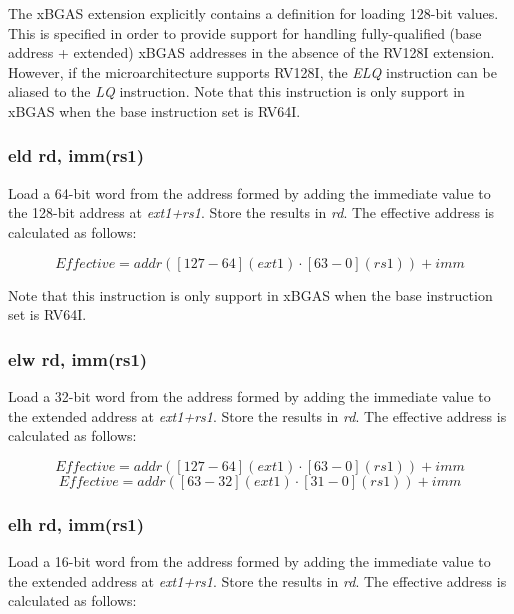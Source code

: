 \documentclass{article}
\begin{document}
\begin{commentary}
The xBGAS extension explicitly contains a definition for loading 128-bit values.  
This is specified in order to provide support for handling fully-qualified (base 
address + extended) xBGAS addresses in the absence of the RV128I extension.  However, 
if the microarchitecture supports RV128I, the \textit{ELQ} instruction can be aliased 
to the \textit{LQ} instruction.  Note that this instruction is only support in xBGAS when the base 
instruction set is RV64I.  
\end{commentary}


\subsubsection{eld rd, imm(rs1)}
Load a 64-bit word from the address formed by adding the immediate value to the 
128-bit address at \textit{ext1+rs1}.  Store the results in \textit{rd}.  The effective 
address is calculated as follows: 

\begin{equation}
Effective = addr([127-64](ext1) \cdot [63-0](rs1))+imm
\end{equation}

\begin{commentary}
Note that this instruction is only support in xBGAS when the base 
instruction set is RV64I.
\end{commentary}

\subsubsection{elw rd, imm(rs1)}
Load a 32-bit word from the address formed by adding the immediate value to the 
extended address at \textit{ext1+rs1}.  Store the results in \textit{rd}.  The effective 
address is calculated as follows: 

\begin{equation}
Effective = addr([127-64](ext1) \cdot [63-0](rs1))+imm
\end{equation}
\begin{equation}
Effective = addr([63-32](ext1) \cdot [31-0](rs1))+imm
\end{equation}

\subsubsection{elh rd, imm(rs1)}
Load a 16-bit word from the address formed by adding the immediate value to the 
extended address at \textit{ext1+rs1}.  Store the results in \textit{rd}.  The effective 
address is calculated as follows: 
\end{document}
